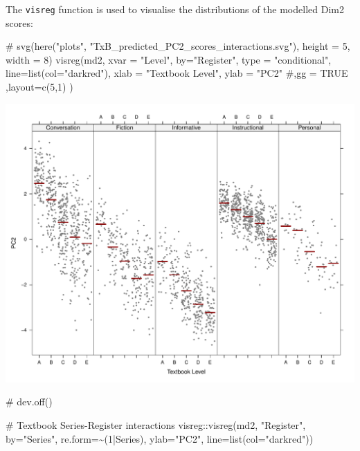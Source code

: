 \documentclass[
  letterpaper,
  DIV=11,
  numbers=noendperiod]{scrreprt}
\newenvironment{Shaded}{\begin{snugshade}}{\end{snugshade}}
\newcommand{\AttributeTok}[1]{\textcolor[rgb]{0.40,0.45,0.13}{#1}}
\newcommand{\CommentTok}[1]{\textcolor[rgb]{0.37,0.37,0.37}{#1}}
\newcommand{\DecValTok}[1]{\textcolor[rgb]{0.68,0.00,0.00}{#1}}
\newcommand{\FunctionTok}[1]{\textcolor[rgb]{0.28,0.35,0.67}{#1}}
\newcommand{\NormalTok}[1]{\textcolor[rgb]{0.00,0.23,0.31}{#1}}
\newcommand{\SpecialCharTok}[1]{\textcolor[rgb]{0.37,0.37,0.37}{#1}}
\newcommand{\StringTok}[1]{\textcolor[rgb]{0.13,0.47,0.30}{#1}}
\begin{document}
The \texttt{visreg} function is used to visualise the distributions of
the modelled Dim2 scores:

\begin{Shaded}
\begin{Highlighting}[]
\CommentTok{\# svg(here("plots", "TxB\_predicted\_PC2\_scores\_interactions.svg"), height = 5, width = 8)}
\FunctionTok{visreg}\NormalTok{(md2, }\AttributeTok{xvar =} \StringTok{"Level"}\NormalTok{, }\AttributeTok{by=}\StringTok{"Register"}\NormalTok{, }\AttributeTok{type =} \StringTok{"conditional"}\NormalTok{,}
       \AttributeTok{line=}\FunctionTok{list}\NormalTok{(}\AttributeTok{col=}\StringTok{"darkred"}\NormalTok{), }
       \AttributeTok{xlab =} \StringTok{"Textbook Level"}\NormalTok{, }\AttributeTok{ylab =} \StringTok{"PC2"}
       \CommentTok{\#,gg = TRUE}
\NormalTok{       ,}\AttributeTok{layout=}\FunctionTok{c}\NormalTok{(}\DecValTok{5}\NormalTok{,}\DecValTok{1}\NormalTok{)}
\NormalTok{)}
\end{Highlighting}
\end{Shaded}

\includegraphics{AppendixF_files/figure-pdf/Dim2estimateplots-1.pdf}

\begin{Shaded}
\begin{Highlighting}[]
\CommentTok{\# dev.off()}

\CommentTok{\# Textbook Series{-}Register interactions}
\NormalTok{visreg}\SpecialCharTok{::}\FunctionTok{visreg}\NormalTok{(md2, }\StringTok{"Register"}\NormalTok{, }\AttributeTok{by=}\StringTok{"Series"}\NormalTok{, }\AttributeTok{re.form=}\SpecialCharTok{\textasciitilde{}}\NormalTok{(}\DecValTok{1}\SpecialCharTok{|}\NormalTok{Series),}
               \AttributeTok{ylab=}\StringTok{"PC2"}\NormalTok{, }\AttributeTok{line=}\FunctionTok{list}\NormalTok{(}\AttributeTok{col=}\StringTok{"darkred"}\NormalTok{))}
\end{Highlighting}
\end{Shaded}
\end{document}
